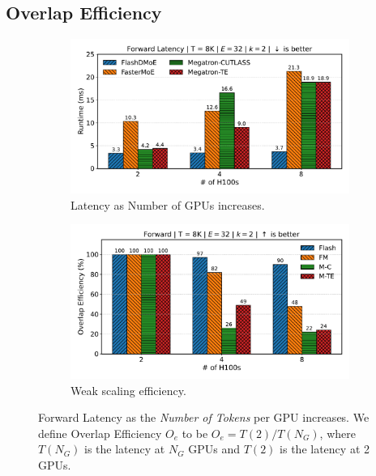 \subsection{Overlap Efficiency}\label{subsec:overlap-efficiency}
\begin{figure}[!h]
    \centering
    \begin{subfigure}{0.49\textwidth}
        \centering
        \includegraphics[width=\linewidth, keepaspectratio]{figures/scaling_gpus_8}
        \caption{Latency as Number of GPUs increases.}
        \label{fig:lng}
    \end{subfigure}
    \begin{subfigure}{0.49\textwidth}
        \centering
        \includegraphics[width=\linewidth, keepaspectratio]{figures/overlap_efficiency_8}
        \caption{Weak scaling efficiency.}
        \label{fig:oe}
    \end{subfigure}
    \caption{Forward Latency as the \emph{Number of Tokens} per GPU increases. We define Overlap Efficiency $O_e$
        to be $O_e = T(2) / T(N_G)$, where $T(N_G)$ is the latency at $N_G$ GPUs and $T(2)$ is the latency at 2 GPUs.}
    \label{fig:oet}
\end{figure}
